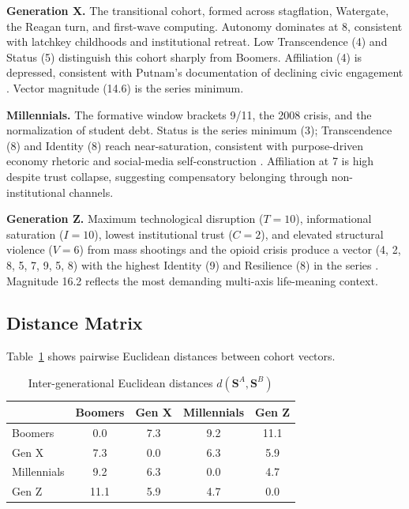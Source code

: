 \documentclass[conference]{IEEEtran}
\begin{document}
\textbf{Generation X.} The transitional cohort, formed across stagflation, Watergate, the Reagan turn, and first-wave computing. Autonomy dominates at 8, consistent with latchkey childhoods and institutional retreat. Low Transcendence (4) and Status (5) distinguish this cohort sharply from Boomers. Affiliation (4) is depressed, consistent with Putnam's documentation of declining civic engagement \cite{putnam2000}. Vector magnitude (14.6) is the series minimum.

\textbf{Millennials.} The formative window brackets 9/11, the 2008 crisis, and the normalization of student debt. Status is the series minimum (3); Transcendence (8) and Identity (8) reach near-saturation, consistent with purpose-driven economy rhetoric and social-media self-construction \cite{twenge2017}. Affiliation at 7 is high despite trust collapse, suggesting compensatory belonging through non-institutional channels.

\textbf{Generation Z.} Maximum technological disruption ($T = 10$), informational saturation ($I = 10$), lowest institutional trust ($C = 2$), and elevated structural violence ($V = 6$) from mass shootings and the opioid crisis produce a vector (4, 2, 8, 5, 7, 9, 5, 8) with the highest Identity (9) and Resilience (8) in the series \cite{unicef2024}. Magnitude 16.2 reflects the most demanding multi-axis life-meaning context.

\subsection{Distance Matrix}

Table~\ref{tab:distance} shows pairwise Euclidean distances between cohort vectors.

\begin{table}[htbp]
\caption{Inter-generational Euclidean distances $d(\mathbf{S}^A, \mathbf{S}^B)$}
\label{tab:distance}
\begin{tabular}{lcccc}
\toprule
 & Boomers & Gen X & Millennials & Gen Z \\
\midrule
Boomers    & 0.0 & 7.3 & 9.2  & 11.1 \\
Gen X      & 7.3 & 0.0 & 6.3  & 5.9  \\
Millennials & 9.2 & 6.3 & 0.0  & 4.7  \\
Gen Z      & 11.1 & 5.9 & 4.7 & 0.0  \\
\bottomrule
\end{tabular}
\end{table}
\end{document}
